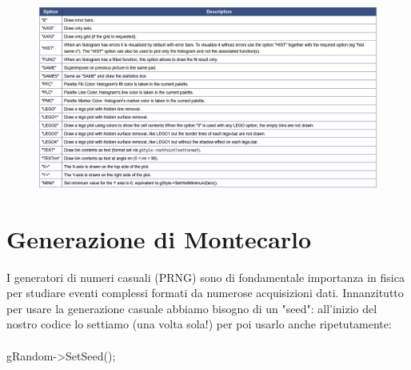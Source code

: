 \documentclass[10pt,a4paper]{article}
\begin{document}
\FloatBarrier
\begin{figure}[h!]
	\centering
	\includegraphics[width=1.\linewidth]{"Screenshot 2022-06-04 222115"}
\end{figure}
\FloatBarrier
\newpage 
\section{Generazione di Montecarlo}\label{sec:montecarlo}
I generatori di numeri casuali (PRNG) sono di fondamentale importanza in fisica per studiare eventi complessi formati da numerose acquisizioni dati. Innanzitutto per usare la generazione casuale abbiamo bisogno di un "seed": all'inizio del nostro codice lo settiamo (una volta sola!) per poi usarlo anche ripetutamente:\\\\
gRandom->SetSeed();
\end{document}
